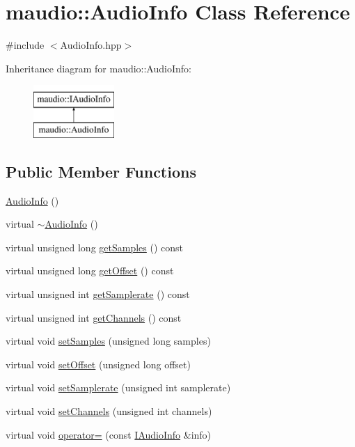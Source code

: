 \hypertarget{classmaudio_1_1AudioInfo}{\section{maudio\-:\-:Audio\-Info Class Reference}
\label{classmaudio_1_1AudioInfo}
}


{\ttfamily \#include $<$Audio\-Info.\-hpp$>$}

Inheritance diagram for maudio\-:\-:Audio\-Info\-:\begin{figure}[H]
\begin{center}
\leavevmode
\includegraphics[height=2.000000cm]{classmaudio_1_1AudioInfo}
\end{center}
\end{figure}
\subsection*{Public Member Functions}
\begin{DoxyCompactItemize}
\item 
\hyperlink{classmaudio_1_1AudioInfo_ae955697a3221c6804495b68c3c8b9a1e}{Audio\-Info} ()
\item 
virtual \hyperlink{classmaudio_1_1AudioInfo_a154342e6963bcfe9f763e0db3c938205}{$\sim$\-Audio\-Info} ()
\item 
virtual unsigned long \hyperlink{classmaudio_1_1AudioInfo_aefb17a9c4301d9dcf6e5c04597892dbd}{get\-Samples} () const 
\item 
virtual unsigned long \hyperlink{classmaudio_1_1AudioInfo_ad89ed92138ad9e3e5b098bee69a9bd96}{get\-Offset} () const 
\item 
virtual unsigned int \hyperlink{classmaudio_1_1AudioInfo_a92e76f5173ea34dfdd0ca42ff0662a6f}{get\-Samplerate} () const 
\item 
virtual unsigned int \hyperlink{classmaudio_1_1AudioInfo_af4d1f9d433e4d29e218ec28bee4ed7db}{get\-Channels} () const 
\item 
virtual void \hyperlink{classmaudio_1_1AudioInfo_aa75d37ecf53cca3a0b7cecfb004da207}{set\-Samples} (unsigned long samples)
\item 
virtual void \hyperlink{classmaudio_1_1AudioInfo_aa1db33ccc763532a5d2858c00b65303a}{set\-Offset} (unsigned long offset)
\item 
virtual void \hyperlink{classmaudio_1_1AudioInfo_a5c466cc04ed7611522ad9ab626b101f5}{set\-Samplerate} (unsigned int samplerate)
\item 
virtual void \hyperlink{classmaudio_1_1AudioInfo_addb04eb7024304a625ef9304fa03dee9}{set\-Channels} (unsigned int channels)
\item 
virtual void \hyperlink{classmaudio_1_1AudioInfo_af407534e7d1ab48005dfb6e43127a0d0}{operator=} (const \hyperlink{classmaudio_1_1IAudioInfo}{I\-Audio\-Info} \&info)
\end{DoxyCompactItemize}


